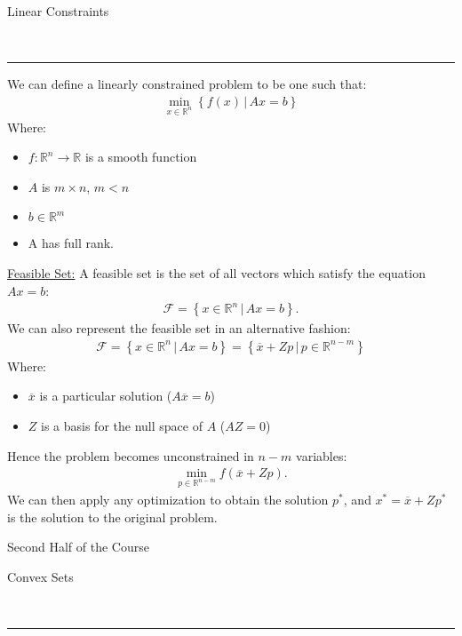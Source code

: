 \documentclass{article}
\newcommand{\header}[1]{\begin{large}\noindent #1\end{large}\\\rule{\textwidth}{0.5pt}}
\newcommand{\sheader}[1]{\underline{#1:}}
\newcommand{\curly}[1]{\left\{#1\right\}}
\begin{document}
\header{Linear Constraints}

We can define a linearly constrained problem to be one such that:
\begin{align*}
    \min_{x \in \mathbb{R}^n} \curly{f(x) \,|\, Ax = b}
\end{align*}
Where:
\begin{itemize}
    \item $f: \mathbb{R}^n \to \mathbb{R}$ is a smooth function
    \item $A$ is $m \times n$, $m < n$
    \item $b \in \mathbb{R}^m$
    \item A has full rank.
\end{itemize}
\sheader{Feasible Set} A feasible set is the set of all vectors which satisfy the equation 
$Ax = b$:
\begin{align*}
    \mathcal{F} = \curly{x \in \mathbb{R}^n \,|\, Ax = b}.
\end{align*}
We can also represent the feasible set in an alternative fashion:
\begin{align*}
    \mathcal{F} = \curly{x \in \mathbb{R}^n \, | \, Ax = b} = \curly{\overline{x} + Zp \,| \, p \in \mathbb{R}^{n - m}}
\end{align*}
Where: \begin{itemize}
    \item $\overline{x}$ is a particular solution ($A\overline{x} = b$)
    \item $Z$ is a basis for the null space of $A$ ($AZ = 0$)
\end{itemize}
Hence the problem becomes unconstrained in $n - m$ variables:
\begin{align*}
    \min_{p \in \mathbb{R}^{n -m}} f(\overline{x} + Zp).
\end{align*}
We can then apply any optimization to obtain the solution $p^*$, and $x^*= \overline{x} + Zp^*$
is the solution to the original problem.

\pagebreak

\begin{center}
    \Large Second Half of the Course\\
    \normalsize
\end{center}

\header{Convex Sets}
\end{document}
